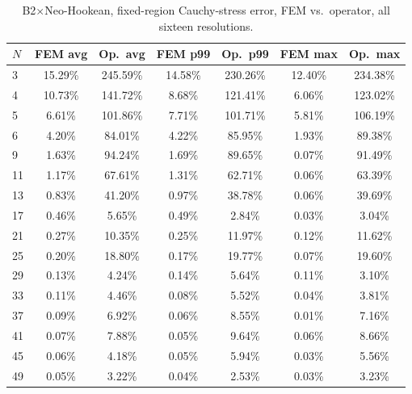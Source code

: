 \documentclass[11pt]{article}
\begin{document}
\begin{table}[h]
\centering
\caption{B2$\times$Neo-Hookean, fixed-region Cauchy-stress error, FEM
  vs.\ operator, all sixteen resolutions.}
\label{tab:s2-b2nh-b}
\scriptsize
\begin{tabular}{lcccccc}
\toprule
$N$ & FEM avg & Op.\ avg & FEM p99 & Op.\ p99 & FEM max & Op.\ max \\
\midrule
3  & 15.29\% & 245.59\% & 14.58\% & 230.26\% & 12.40\% & 234.38\% \\
4  & 10.73\% & 141.72\% & 8.68\%  & 121.41\% & 6.06\%  & 123.02\% \\
5  & 6.61\%  & 101.86\% & 7.71\%  & 101.71\% & 5.81\%  & 106.19\% \\
6  & 4.20\%  & 84.01\%  & 4.22\%  & 85.95\%  & 1.93\%  & 89.38\%  \\
9  & 1.63\%  & 94.24\%  & 1.69\%  & 89.65\%  & 0.07\%  & 91.49\%  \\
11 & 1.17\%  & 67.61\%  & 1.31\%  & 62.71\%  & 0.06\%  & 63.39\%  \\
13 & 0.83\%  & 41.20\%  & 0.97\%  & 38.78\%  & 0.06\%  & 39.69\%  \\
17 & 0.46\%  & 5.65\%   & 0.49\%  & 2.84\%   & 0.03\%  & 3.04\%   \\
21 & 0.27\%  & 10.35\%  & 0.25\%  & 11.97\%  & 0.12\%  & 11.62\%  \\
25 & 0.20\%  & 18.80\%  & 0.17\%  & 19.77\%  & 0.07\%  & 19.60\%  \\
29 & 0.13\%  & 4.24\%   & 0.14\%  & 5.64\%   & 0.11\%  & 3.10\%   \\
33 & 0.11\%  & 4.46\%   & 0.08\%  & 5.52\%   & 0.04\%  & 3.81\%   \\
37 & 0.09\%  & 6.92\%   & 0.06\%  & 8.55\%   & 0.01\%  & 7.16\%   \\
41 & 0.07\%  & 7.88\%   & 0.05\%  & 9.64\%   & 0.06\%  & 8.66\%   \\
45 & 0.06\%  & 4.18\%   & 0.05\%  & 5.94\%   & 0.03\%  & 5.56\%   \\
49 & 0.05\%  & 3.22\%   & 0.04\%  & 2.53\%   & 0.03\%  & 3.23\%   \\
\bottomrule
\end{tabular}
\end{table}
\end{document}
